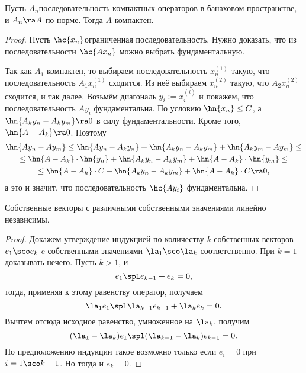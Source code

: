 \documentclass[a4paper]{article}
\newcommand{\n}[1]{^{(#1)}}
\begin{document}
\begin{theorem}
Пусть $A_n$\т последовательность компактных операторов в банаховом пространстве, и $A_n \ra A$ по норме.
Тогда $A$ компактен.
\end{theorem}
\begin{proof}
Пусть $\hc{x_n}$\т ограниченная последовательность. Нужно доказать, что
из последовательности $\hc{Ax_n}$ можно выбрать фундаментальную.

Так как $A_1$ компактен, то выбираем последовательность $x_n\n1$ такую, что
последовательность $A_1 x_n\n1$ сходится. Из неё выбираем $x_n\n2$ такую, что $A_2x_n\n2$ сходится,
и так далее. Возьмём диагональ $y_i := x_i\n i$ и покажем, что последовательность $Ay_i$ фундаментальна.
По условию $\hn{x_n} \le C$, а $\hn{A_k y_n - A_k y_m} \ra 0$ в силу фундаментальности.
Кроме того, $\hn{A - A_k} \ra 0$. Поэтому
\begin{multline*}
\hn{Ay_n-Ay_m} \le \hn{A y_n-A_k y_n} + \hn{A_k y_n - A_k y_m} + \hn{A_k y_m - A y_m} \le \\ \le
\hn{A-A_k}\cdot\hn{y_n} + \hn{A_k y_n - A_k y_m} + \hn{A-A_k}\cdot\hn{y_m}\le \\ \le
\hn{A-A_k}\cdot C + \hn{A_k y_n - A_k y_m} + \hn{A-A_k}\cdot C \ra 0,
\end{multline*}
а это и значит, что последовательность $\hc{A y_i}$ фундаментальна.
\end{proof}

\begin{lemma}
Собственные векторы с различными собственными значениями линейно независимы.
\end{lemma}
\begin{proof}
Докажем утверждение индукцией по количеству $k$ собственных векторов $e_1\sco e_k$ c собственными
значениями $\la_1\sco \la_k$ соответственно. При $k = 1$ доказывать нечего.
Пусть $k > 1$, и
$$e_1\spl e_{k-1} + e_k = 0,$$
тогда, применяя к этому равенству оператор, получаем
$$\la_1e_1\spl \la_{k-1}e_{k-1} + \la_k e_k = 0.$$
Вычтем отсюда исходное равенство, умноженное на $\la_k$, получим
$$(\la_1-\la_k)e_1\spl (\la_{k-1}-\la_k)e_{k-1} = 0.$$
По предположению индукции такое возможно только если
$e_i = 0$ при $i = 1\sco k-1$. Но тогда и $e_k = 0$.
\end{proof}
\end{document}
